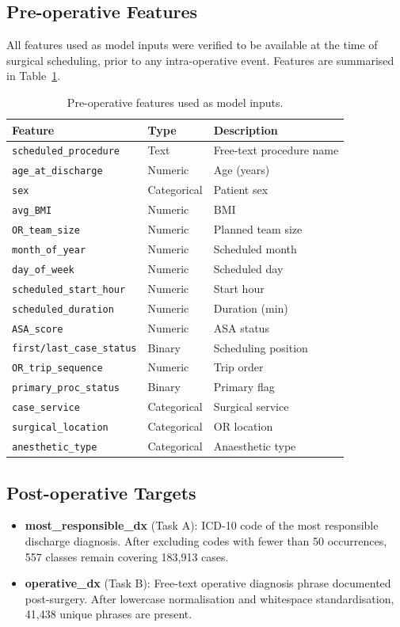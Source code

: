 \documentclass[10pt,twocolumn]{article}
\begin{document}
\subsection{Pre-operative Features}
All features used as model inputs were verified to be available at the time of surgical scheduling, prior to any intra-operative event. Features are summarised in Table~\ref{tab:features}.

\begin{table}[H]
\centering
\caption{Pre-operative features used as model inputs.}
\label{tab:features}
\small
\scriptsize
\begin{tabular}{p{3.2cm}p{1.5cm}p{2.2cm}}
\toprule
\textbf{Feature} & \textbf{Type} & \textbf{Description} \\
\midrule
\texttt{scheduled\_procedure} & Text & Free-text procedure name \\
\texttt{age\_at\_discharge} & Numeric & Age (years) \\
\texttt{sex} & Categorical & Patient sex \\
\texttt{avg\_BMI} & Numeric & BMI \\
\texttt{OR\_team\_size} & Numeric & Planned team size \\
\texttt{month\_of\_year} & Numeric & Scheduled month \\
\texttt{day\_of\_week} & Numeric & Scheduled day \\
\texttt{scheduled\_start\_hour} & Numeric & Start hour \\
\texttt{scheduled\_duration} & Numeric & Duration (min) \\
\texttt{ASA\_score} & Numeric & ASA status \\
\texttt{first/last\_case\_status} & Binary & Scheduling position \\
\texttt{OR\_trip\_sequence} & Numeric & Trip order \\
\texttt{primary\_proc\_status} & Binary & Primary flag \\
\texttt{case\_service} & Categorical & Surgical service \\
\texttt{surgical\_location} & Categorical & OR location \\
\texttt{anesthetic\_type} & Categorical & Anaesthetic type \\
\bottomrule
\end{tabular}
\end{table}

\subsection{Post-operative Targets}
\begin{itemize}[leftmargin=*,itemsep=2pt]
  \item \textbf{most\_responsible\_dx} (Task A): ICD-10 code of the most responsible discharge diagnosis. After excluding codes with fewer than 50 occurrences, 557 classes remain covering 183,913 cases.
  \item \textbf{operative\_dx} (Task B): Free-text operative diagnosis phrase documented post-surgery. After lowercase normalisation and whitespace standardisation, 41,438 unique phrases are present.
\end{itemize}
\end{document}
